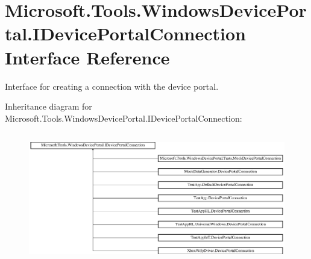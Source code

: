 \hypertarget{interface_microsoft_1_1_tools_1_1_windows_device_portal_1_1_i_device_portal_connection}{}\section{Microsoft.\+Tools.\+Windows\+Device\+Portal.\+I\+Device\+Portal\+Connection Interface Reference}
\label{interface_microsoft_1_1_tools_1_1_windows_device_portal_1_1_i_device_portal_connection}


Interface for creating a connection with the device portal.  


Inheritance diagram for Microsoft.\+Tools.\+Windows\+Device\+Portal.\+I\+Device\+Portal\+Connection\+:\begin{figure}[H]
\begin{center}
\leavevmode
\includegraphics[height=5.740319cm]{interface_microsoft_1_1_tools_1_1_windows_device_portal_1_1_i_device_portal_connection}
\end{center}
\end{figure}
